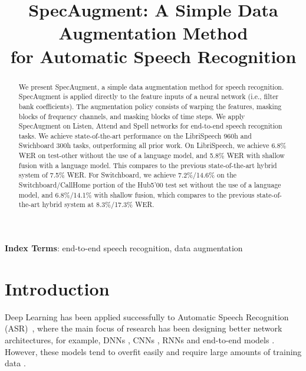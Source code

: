 \title{SpecAugment: A Simple Data Augmentation Method\\
for Automatic Speech Recognition}



\maketitle
\begin{abstract}
We present SpecAugment, a simple data augmentation method for speech recognition. SpecAugment is applied directly to the feature inputs of a neural network (i.e., filter bank coefficients). The augmentation policy consists of warping the features, masking blocks of frequency channels, and masking blocks of time steps. We apply SpecAugment on Listen, Attend and Spell networks for end-to-end speech recognition tasks. We achieve state-of-the-art performance on the LibriSpeech 960h and Swichboard 300h tasks, outperforming all prior work. On LibriSpeech, we achieve 6.8\% WER on test-other without the use of a language model, and 5.8\% WER with shallow fusion with a language model. This compares to the previous state-of-the-art hybrid system of 7.5\% WER. For Switchboard, we achieve 7.2\%/14.6\% on the Switchboard/CallHome portion of the Hub5'00 test set without the use of a language model, and 6.8\%/14.1\% with shallow fusion, which compares to the previous state-of-the-art hybrid system at 8.3\%/17.3\% WER.
\end{abstract}
\noindent\textbf{Index Terms}: end-to-end speech recognition, data augmentation

\section{Introduction}

Deep Learning has been applied successfully to Automatic Speech Recognition (ASR)~\cite{hinton2012deep}, where the main focus of research has been  designing better  network architectures, for example, DNNs \cite{dahl-ieeetasl-2012}, CNNs \cite{sainath-icassp-2013}, RNNs \cite{graves-icassp-2013} and end-to-end models \cite{graves-icml-2014,Chan2016ListenAA,bahdanau-icassp-2016}. However, these  models tend to overfit easily and require large amounts of training data \cite{chiu-icassp-2018}.

